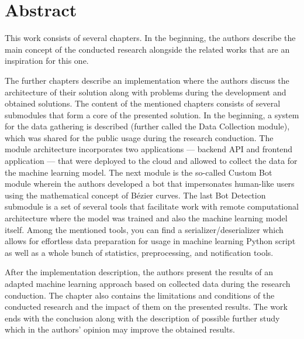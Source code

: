 \section{Abstract}\label{sec:abstract}
This work consists of several chapters.
In the beginning, the authors describe the main concept of the conducted research alongside the related works that are an inspiration for this one.

The further chapters describe an implementation where the authors discuss the architecture of their solution along with problems during the development and obtained solutions.
The content of the mentioned chapters consists of several submodules that form a core of the presented solution.
In the beginning, a system for the data gathering is described (further called the Data Collection module), which was shared for the public usage during the research conduction.
The module architecture incorporates two applications --- backend API and frontend application --- that were deployed to the cloud and allowed to collect the data for the machine learning model.
The next module is the so-called Custom Bot module wherein the authors developed a bot that impersonates human-like users using the mathematical concept of Bézier curves.
The last Bot Detection submodule is a set of several tools that facilitate work with remote computational architecture where the model was trained and also the machine learning model itself.
Among the mentioned tools, you can find a serializer/deserializer which allows for effortless data preparation for usage in machine learning Python script as well as a whole bunch of statistics, preprocessing, and notification tools.

After the implementation description, the authors present the results of an adapted machine learning approach based on collected data during the research conduction.
The chapter also contains the limitations and conditions of the conducted research and the impact of them on the presented results.
The work ends with the conclusion along with the description of possible further study which in the authors' opinion may improve the obtained results.